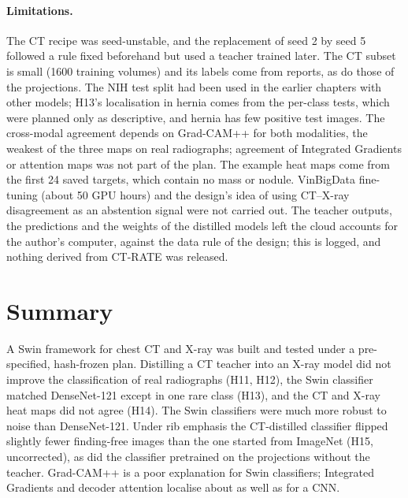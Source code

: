 \paragraph{Limitations.} The CT recipe was seed-unstable, and the replacement of seed 2 by seed 5 followed a rule fixed beforehand but
used a teacher trained later. The CT subset is small (\num{1600} training volumes) and its labels come from reports, as do those of the
projections. The NIH test split had been used in the earlier chapters with other models; H13's localisation in hernia comes from the
per-class tests, which were planned only as descriptive, and hernia has few positive test images. The cross-modal agreement depends on
Grad-CAM++ for both modalities, the weakest of the three maps on real radiographs; agreement of Integrated Gradients or attention maps was
not part of the plan. The example heat maps come from the first 24 saved targets, which contain no mass or nodule. VinBigData fine-tuning
(about 50 GPU hours) and the design's idea of using CT--X-ray disagreement as an abstention signal were not carried out. The teacher
outputs, the predictions and the weights of the distilled models left the cloud accounts for the author's computer, against the data
rule of the design; this is logged, and nothing derived from CT-RATE was released.

\section{Summary}
\label{sec:xm_summary}
A Swin framework for chest CT and X-ray was built and tested under a pre-specified, hash-frozen plan. Distilling a CT teacher into an X-ray
model did not improve the classification of real radiographs (H11, H12), the Swin classifier matched DenseNet-121 except in one rare class
(H13), and the CT and X-ray heat maps did not agree (H14). The Swin classifiers were much more robust to noise than DenseNet-121. Under
rib emphasis the CT-distilled classifier flipped slightly fewer finding-free images than the one started from ImageNet (H15, uncorrected),
as did the classifier pretrained on the projections without the teacher. Grad-CAM++ is a poor explanation for Swin classifiers;
Integrated Gradients and decoder attention localise about as well as for a CNN.
